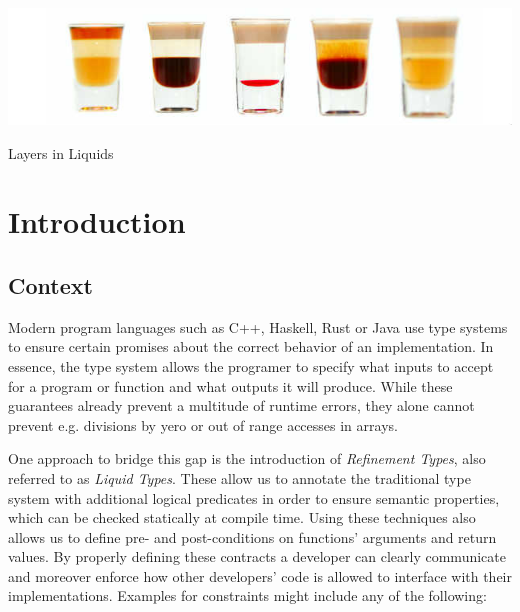 \documentclass[acmsmall, review, screen]{acmart}
\begin{document}
\keywords{}
\begin{teaserfigure}
  \includegraphics[width=\textwidth]{layered-shots.jpg}
  \label{fig:teaser}
  \caption{Layers in Liquids}
\end{teaserfigure}


\maketitle

\section{Introduction}
\subsection{Context}
Modern program languages such as C++, Haskell, Rust or Java use type systems to ensure certain promises about the correct behavior of an implementation. In essence, the type system allows the programer to specify what inputs to accept for a program or function and what outputs it will produce. While these guarantees already prevent a multitude of runtime errors, they alone cannot prevent e.g. divisions by yero or out of range accesses in arrays.

One approach to bridge this gap is the introduction of \textit{Refinement Types}, also referred to as \textit{Liquid Types}. These allow us to annotate the traditional type system with additional logical predicates in order to ensure semantic properties, which can be checked statically at compile time. Using these techniques also allows us to define pre- and post-conditions on functions' arguments and return values. By properly defining these contracts a developer can clearly communicate and moreover enforce how other developers' code is allowed to interface with their implementations. Examples for constraints might include any of the following:
\end{document}
